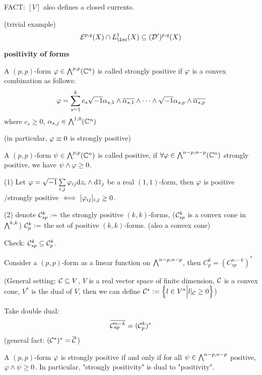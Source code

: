 FACT: $[V]$ also defines a closed currents.

\begin{example}(trivial example)
$$
  \mcalE^{p,q}(X)\cap L^1_{\loc}(X)
  \subseteq(\mcalD')^{p,q}(X)
$$
\end{example}

\textbf{positivity of forms}

\begin{definition}
A $(p,p)$-form $\varphi\in\bigwedge\nolimits^{p,p}(\mathbb{C}^n)$ 
is called strongly positive if $\varphi$
is a convex combination as follows:
$$
  \varphi
=
  \sum_{s=1}^k
    c_s\sqrt{-1}
    \alpha_{s,1}\wedge\overline{\alpha_{s,1}}
    \wedge\cdots\wedge
    \sqrt{-1}\alpha_{s,p}\wedge\overline{\alpha_{s,p}}
$$
where $c_s\geq 0$, $\alpha_{s,j}\in\bigwedge\nolimits^{1,0}(\mathbb{C}^n)$
\end{definition}
(in particular, $\varphi\equiv0$ is strongly positive)

\begin{definition}
A $(p,p)$-form $\psi\in\bigwedge\nolimits^{p,p}(\mathbb{C}^n)$ is called positive,
if $\forall\varphi\in\bigwedge\nolimits^{n-p,n-p}(\mathbb{C}^n)$ strongly positive,
we have $\psi\wedge\varphi\geq 0$.
\end{definition}

\begin{rem}(1)
Let $\varphi=\sqrt{-1}\sum\limits_{i,j}\varphi_{ij}\mathrm{d} z_i\wedge\mathrm{d}\overline{z}_j$
be a real $(1,1)$-form, then $\varphi$ is positive /strongly positive
$\iff[\varphi_{ij}]_{i,j}\geq 0$.

(2) denote $\mathcal{C}_{sp}^k:=$ the strongly positive $(k,k)$-forms,
($\mathcal{C}_{sp}^k$ is a convex cone in $\bigwedge\nolimits^{k,k}$)
$\mathcal{C}_p^k:=$ the set of positive $(k,k)$-forms.
(also a convex cone)
\end{rem}

Check: $\mathcal{C}_{sp}^k\subseteq\mathcal{C}_p^k$.

Consider a $(p,p)$-form as a linear function on $\bigwedge\nolimits^{n-p,n-p}$,
then $C_p^k=(C_{sp}^{n-k})^*$

(General setting: $\mathcal{C}\subseteq V$, $V$ 
is a real vector space of finite dimension,
$\mathcal{C}$ is a convex cone, $V^*$ is the dual of $V$, then we can define 
$\mathcal{C}^*:=\Big\{ l\in V^* \Big| l|_{\mathcal{C}}\geq 0 \Big\}$)

Take double dual:
$$\overline{\mathcal{C}_{sp}^{n-k}}=(\mathcal{C}_p^k)^*$$
(general fact: $(\mathcal{C}^*)^*=\overline{\mathcal{C}}$)

\begin{cor}
A $(p,p)$-form $\varphi$ is strongly positive if and only if 
for all $\psi\in\bigwedge\nolimits^{n-p,n-p}$ positive,
$\varphi\wedge\psi\geq 0$. In particular,
"strongly positivity" is dual to "positivity". 
\end{cor}







